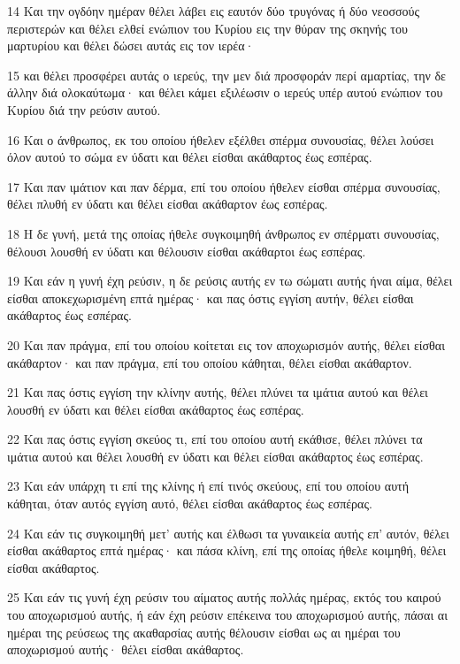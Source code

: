 \par 14 Και την ογδόην ημέραν θέλει λάβει εις εαυτόν δύο τρυγόνας ή δύο νεοσσούς περιστερών και θέλει ελθεί ενώπιον του Κυρίου εις την θύραν της σκηνής του μαρτυρίου και θέλει δώσει αυτάς εις τον ιερέα·
\par 15 και θέλει προσφέρει αυτάς ο ιερεύς, την μεν διά προσφοράν περί αμαρτίας, την δε άλλην διά ολοκαύτωμα· και θέλει κάμει εξιλέωσιν ο ιερεύς υπέρ αυτού ενώπιον του Κυρίου διά την ρεύσιν αυτού.
\par 16 Και ο άνθρωπος, εκ του οποίου ήθελεν εξέλθει σπέρμα συνουσίας, θέλει λούσει όλον αυτού το σώμα εν ύδατι και θέλει είσθαι ακάθαρτος έως εσπέρας.
\par 17 Και παν ιμάτιον και παν δέρμα, επί του οποίου ήθελεν είσθαι σπέρμα συνουσίας, θέλει πλυθή εν ύδατι και θέλει είσθαι ακάθαρτον έως εσπέρας.
\par 18 Η δε γυνή, μετά της οποίας ήθελε συγκοιμηθή άνθρωπος εν σπέρματι συνουσίας, θέλουσι λουσθή εν ύδατι και θέλουσιν είσθαι ακάθαρτοι έως εσπέρας.
\par 19 Και εάν η γυνή έχη ρεύσιν, η δε ρεύσις αυτής εν τω σώματι αυτής ήναι αίμα, θέλει είσθαι αποκεχωρισμένη επτά ημέρας· και πας όστις εγγίση αυτήν, θέλει είσθαι ακάθαρτος έως εσπέρας.
\par 20 Και παν πράγμα, επί του οποίου κοίτεται εις τον αποχωρισμόν αυτής, θέλει είσθαι ακάθαρτον· και παν πράγμα, επί του οποίου κάθηται, θέλει είσθαι ακάθαρτον.
\par 21 Και πας όστις εγγίση την κλίνην αυτής, θέλει πλύνει τα ιμάτια αυτού και θέλει λουσθή εν ύδατι και θέλει είσθαι ακάθαρτος έως εσπέρας.
\par 22 Και πας όστις εγγίση σκεύος τι, επί του οποίου αυτή εκάθισε, θέλει πλύνει τα ιμάτια αυτού και θέλει λουσθή εν ύδατι και θέλει είσθαι ακάθαρτος έως εσπέρας.
\par 23 Και εάν υπάρχη τι επί της κλίνης ή επί τινός σκεύους, επί του οποίου αυτή κάθηται, όταν αυτός εγγίση αυτό, θέλει είσθαι ακάθαρτος έως εσπέρας.
\par 24 Και εάν τις συγκοιμηθή μετ' αυτής και έλθωσι τα γυναικεία αυτής επ' αυτόν, θέλει είσθαι ακάθαρτος επτά ημέρας· και πάσα κλίνη, επί της οποίας ήθελε κοιμηθή, θέλει είσθαι ακάθαρτος.
\par 25 Και εάν τις γυνή έχη ρεύσιν του αίματος αυτής πολλάς ημέρας, εκτός του καιρού του αποχωρισμού αυτής, ή εάν έχη ρεύσιν επέκεινα του αποχωρισμού αυτής, πάσαι αι ημέραι της ρεύσεως της ακαθαρσίας αυτής θέλουσιν είσθαι ως αι ημέραι του αποχωρισμού αυτής· θέλει είσθαι ακάθαρτος.
